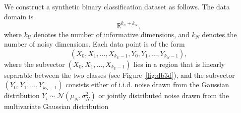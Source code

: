 \documentclass[11pt, twoside]{report}
\begin{document}

We construct a synthetic binary classification dataset as follows. The data domain is 
\[
\mathbb{R}^{k_U + k_N},
\]
where $k_U$ denotes the number of informative dimensions, and $k_N$ denotes the number of noisy dimensions. Each data point is of the form  
\[
(X_0, X_1, \dots, X_{k_U-1}, Y_0, Y_1, \dots, Y_{k_N-1}),
\]  
where the subvector $(X_0, X_1, \dots, X_{k_U-1})$ lies in a region that is linearly separable between the two classes (see Figure~\ref{fig:db3d}), and the subvector $(Y_0, Y_1, \dots, Y_{k_N-1})$ consists either of i.i.d. noise drawn from the Gaussian distribution $Y_i \sim \mathcal{N}(\mu_N, \sigma_N^2)$ or jointly distributed noise drawn from the multivariate Gaussian distribution
\end{document}
